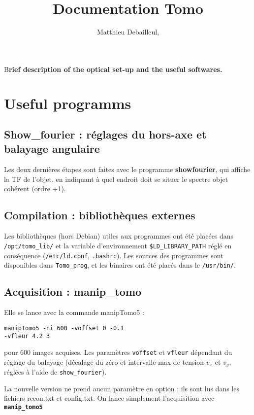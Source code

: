 \documentclass[	french,DIV=calc,%
							paper=a4,%
							fontsize=11pt,%
							twocolumn]{scrartcl}	 					%
\title{Documentation Tomo}					%
\author{Matthieu Debailleul, }											%
\date{}																				%
\newcommand{\code}[1]{\texttt{#1}}
\newcommand{\initial}[1]{%
     \lettrine[lines=3,lhang=0.3,nindent=0em]{
     				\color{DarkGoldenrod}
     				{\textsf{#1}}}{}}
\begin{document}
\maketitle
\thispagestyle{fancy} 			%
\initial{B}\textbf{rief description of the optical set-up and the useful softwares.}


\section{Useful programms}

\subsection*{Show\_fourier : réglages du hors-axe et balayage angulaire}

Les deux dernières étapes sont faites avec le programme \textbf{showfourier}, qui affiche la TF de l'objet.  en indiquant à quel 
endroit doit se situer le spectre objet cohérent (ordre +1).



\subsection{Compilation :  bibliothèques externes}
Les bibliothèques (hors Debian) utiles aux programmes ont été placées dans 
\texttt{/opt/tomo\_lib/} et la variable d'environnement \texttt{\$LD\_LIBRARY\_PATH} réglé en conséquence (\texttt{/etc/ld.conf}, \texttt{.bashrc}). Les sources des programmes sont disponibles 
dans \texttt{Tomo\_prog}, et les binaires ont été placés dans le 
\texttt{/usr/bin/}. 

\subsection{Acquisition : manip\_tomo}
Elle se lance avec la commande manipTomo5 : 
    \begin{center}
    \texttt{manipTomo5 -ni 600 -voffset 0 -0.1 \\-vfleur 4.2 3}   
    \end{center}
    
 pour 600 images acquises. 
Les paramètres \texttt{voffset} et \texttt{vfleur} dépendant du réglage du balayage (décalage du zéro et intervalle max de tension  $v_x$ et $v_y$, réglées à l'aide de \code{show\_fourier}).

La nouvelle version ne prend aucun paramètre en option : ils sont lus dans les fichiers recon.txt et config.txt.  
On lance simplement  l'acquisition avec \textbf{\code{manip\_tomo5}}
\end{document}
